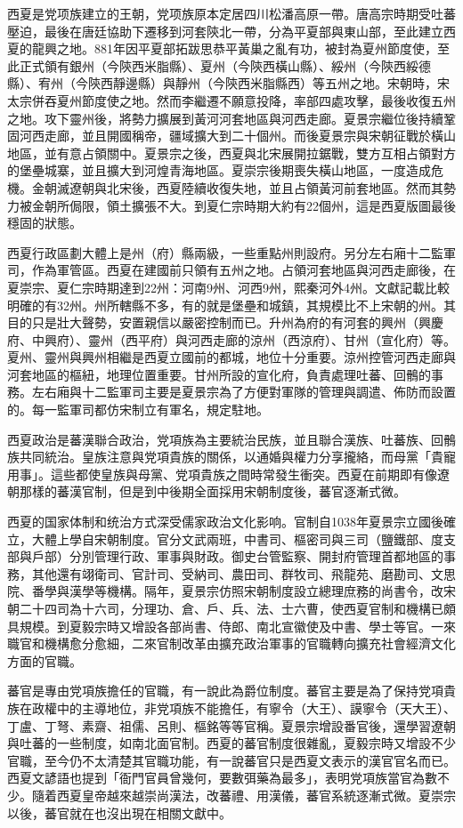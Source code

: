 西夏是党项族建立的王朝，党项族原本定居四川松潘高原一帶。唐高宗時期受吐蕃壓迫，最後在唐廷協助下遷移到河套陝北一帶，分為平夏部與東山部，至此建立西夏的龍興之地。881年因平夏部拓跋思恭平黃巢之亂有功，被封為夏州節度使，至此正式領有銀州（今陝西米脂縣）、夏州（今陝西橫山縣）、綏州（今陝西綏德縣）、宥州（今陝西靜邊縣）與靜州（今陝西米脂縣西）等五州之地。宋朝時，宋太宗併吞夏州節度使之地。然而李繼遷不願意投降，率部四處攻擊，最後收復五州之地。攻下靈州後，將勢力擴展到黃河河套地區與河西走廊。夏景宗繼位後持續鞏固河西走廊，並且開國稱帝，疆域擴大到二十個州。而後夏景宗與宋朝征戰於橫山地區，並有意占領關中。夏景宗之後，西夏與北宋展開拉鋸戰，雙方互相占領對方的堡壘城寨，並且擴大到河煌青海地區。夏崇宗後期喪失橫山地區，一度造成危機。金朝滅遼朝與北宋後，西夏陸續收復失地，並且占領黃河前套地區。然而其勢力被金朝所侷限，領土擴張不大。到夏仁宗時期大約有22個州，這是西夏版圖最後穩固的狀態。

西夏行政區劃大體上是州（府）縣兩級，一些重點州則設府。另分左右廂十二監軍司，作為軍管區。西夏在建國前只領有五州之地。占領河套地區與河西走廊後，在夏崇宗、夏仁宗時期達到22州：河南9州、河西9州，熙秦河外4州。文獻記載比較明確的有32州。州所轄縣不多，有的就是堡壘和城鎮，其規模比不上宋朝的州。其目的只是壯大聲勢，安置親信以嚴密控制而已。升州為府的有河套的興州（興慶府、中興府）、靈州（西平府）與河西走廊的涼州（西涼府）、甘州（宣化府）等。夏州、靈州與興州相繼是西夏立國前的都城，地位十分重要。涼州控管河西走廊與河套地區的樞紐，地理位置重要。甘州所設的宣化府，負責處理吐蕃、回鶻的事務。左右廂與十二監軍司主要是夏景宗為了方便對軍隊的管理與調遣、佈防而設置的。每一監軍司都仿宋制立有軍名，規定駐地。

西夏政治是蕃漢聯合政治，党項族為主要統治民族，並且聯合漢族、吐蕃族、回鶻族共同統治。皇族注意與党項貴族的關係，以通婚與權力分享攏絡，而母黨「貴寵用事」。這些都使皇族與母黨、党項貴族之間時常發生衝突。西夏在前期即有像遼朝那樣的蕃漢官制，但是到中後期全面採用宋朝制度後，蕃官逐漸式微。

西夏的国家体制和统治方式深受儒家政治文化影响。官制自1038年夏景宗立國後確立，大體上學自宋朝制度。官分文武兩班，中書司、樞密司與三司（鹽鐵部、度支部與戶部）分別管理行政、軍事與財政。御史台管監察、開封府管理首都地區的事務，其他還有翊衛司、官計司、受納司、農田司、群牧司、飛龍苑、磨勘司、文思院、番學與漢學等機構。隔年，夏景宗仿照宋朝制度設立總理庶務的尚書令，改宋朝二十四司為十六司，分理功、倉、戶、兵、法、士六曹，使西夏官制和機構已頗具規模。到夏毅宗時又增設各部尚書、侍郎、南北宣徽使及中書、學士等官。一來職官和機構愈分愈細，二來官制改革由擴充政治軍事的官職轉向擴充社會經濟文化方面的官職。

蕃官是專由党項族擔任的官職，有一說此為爵位制度。蕃官主要是為了保持党項貴族在政權中的主導地位，非党項族不能擔任，有寧令（大王）、謨寧令（天大王）、丁盧、丁弩、素齋、祖儒、呂則、樞銘等等官稱。夏景宗增設番官後，還學習遼朝與吐蕃的一些制度，如南北面官制。西夏的蕃官制度很雜亂，夏毅宗時又增設不少官職，至今仍不太清楚其官職功能，有一說蕃官只是西夏文表示的漢官官名而已。西夏文諺語也提到「衙門官員曾幾何，要數弭藥為最多」，表明党項族當官為數不少。隨着西夏皇帝越來越崇尚漢法，改蕃禮、用漢儀，蕃官系統逐漸式微。夏崇宗以後，蕃官就在也沒出現在相關文獻中。

